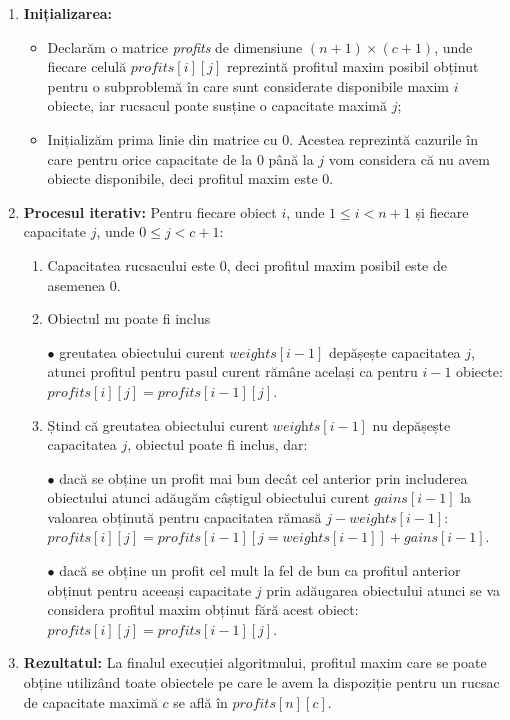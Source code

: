 \begin{sloppypar}
\begin{tcolorbox}[mystyle]
\begin{enumerate}[left=0.2em]
    \item \textbf{Inițializarea:}
    \begin{itemize}
        \item Declarăm o matrice \textit{profits} de dimensiune $ (n + 1) \times (c + 1) $, unde fiecare celulă $ \textit{profits}[i][j] $ reprezintă profitul maxim posibil obținut pentru o subproblemă în care sunt considerate disponibile maxim $i$ obiecte, iar rucsacul poate susține o capacitate maximă $j$;
        \item Inițializăm prima linie din matrice cu 0. Acestea reprezintă cazurile în care pentru orice capacitate de la 0 până la $j$ vom considera că nu avem obiecte disponibile, deci profitul maxim este 0. 
    \end{itemize}
    \item \textbf{Procesul iterativ:}
    Pentru fiecare obiect $i$, unde $1 \le i < n + 1$ și fiecare capacitate $j$, unde $0 \le j < c + 1$:
    \begin{enumerate}
        \item Capacitatea rucsacului este 0, deci profitul maxim posibil este de asemenea 0.
        \item Obiectul nu poate fi inclus \par
            $\bullet$ greutatea obiectului curent $\textit{weights}[i - 1]$ depășește capacitatea $j$, atunci profitul pentru pasul curent rămâne același ca pentru $i - 1$ obiecte: $\textit{profits}[i][j] = \textit{profits}[i - 1][j]$.
        \item Ștind că greutatea obiectului curent $\textit{weights}[i - 1]$ nu depășește capacitatea $j$, obiectul poate fi inclus, dar: \par
        $\bullet$ dacă se obține un profit mai bun decât cel anterior prin includerea obiectului atunci adăugăm câștigul obiectului curent $\textit{gains}[i - 1]$ la valoarea obținută pentru capacitatea rămasă $j - \textit{weights}[i - 1]$: $\textit{profits}[i][j] = \textit{profits}[i - 1][j = \textit{weights}[i - 1]] + \textit{gains}[i - 1]$. \par
        $\bullet$ dacă se obține un profit cel mult la fel de bun ca profitul anterior obținut pentru aceeași capacitate $j$ prin adăugarea obiectului atunci se va considera profitul maxim obținut fără acest obiect: $\textit{profits}[i][j] = \textit{profits}[i - 1][j]$.
    \end{enumerate}
    \item \textbf{Rezultatul:}
    La finalul execuției algoritmului, profitul maxim care se poate obține utilizând toate obiectele pe care le avem la dispoziție pentru un rucsac de capacitate maximă $c$ se află în $\textit{profits}[n][c]$.
\end{enumerate}
\end{tcolorbox}


\end{sloppypar}
